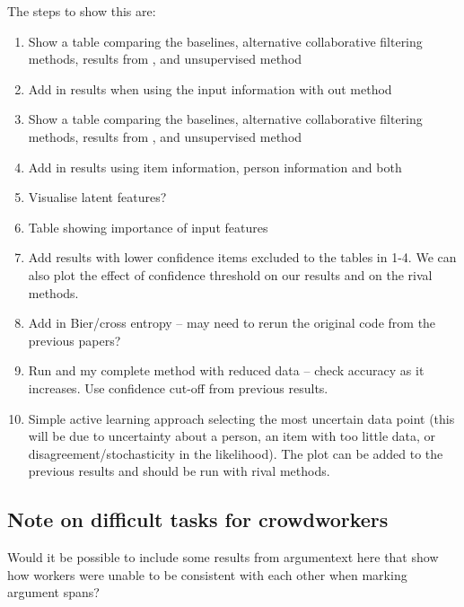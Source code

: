 The steps to show this are:
\begin{enumerate}
  \item Show a table comparing the baselines, alternative collaborative filtering methods, 
  results from \cite{habernal2016argument}, and unsupervised method
  \item Add in results when using the input information with out method
  \item Show a table comparing the baselines, alternative collaborative filtering methods, 
  results from \cite{lukin2017argument}, and unsupervised method
  \item Add in results using item information, person information and both
  \item Visualise latent features?
  \item Table showing importance of input features
  \item Add results with lower confidence items excluded to the tables in 1-4. We can also plot the
  effect of confidence threshold on our results and on the rival methods.
  \item Add in Bier/cross entropy -- may need to rerun the original code from the previous papers?
  \item Run \cite{habernal2016argument} and my complete method with reduced data -- check accuracy as it increases. Use confidence cut-off from previous results.
  \item Simple active learning approach selecting the most uncertain data point (this will be due to 
  uncertainty about a person, an item with too little data, or disagreement/stochasticity in the likelihood). The plot can be added to the previous results and should be run with rival methods.
\end{enumerate}

\subsection{Note on difficult tasks for crowdworkers}

Would it be possible to include some results from argumentext here that show how workers were unable to be consistent with each other when marking argument spans?
